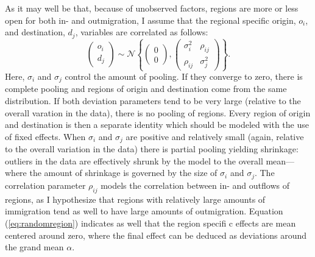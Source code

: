 \documentclass[11pt,parskip,abstracton,notitlepage, dvipsnames]{scrartcl}
\begin{document}
As it may well be that, because of unobserved factors, regions are more or less
open for both in- and outmigration, I assume that the regional specific origin,
$o_i$, and destination, $d_j$, variables are correlated as follows:
\begin{equation}
	\begin{pmatrix}o_i\\
		d_j
	\end{pmatrix} \sim \mathcal{N} \left\{\left(\begin{array}{c}
	0\\
	0
       \end{array}\right),
\left(                                        
\begin{array}{cc}
  \sigma^2_i & \rho_{ij} \\
  \rho_{ij} & \sigma^2_{j} 
\end{array}
\right)
\right\}.
\label{eq:randomregion}
\end{equation}
Here, $\sigma_i$ and $\sigma_j$ control the amount of pooling. If they converge
to zero, there is complete pooling and regions of origin and destination come
from the same distribution. If both deviation parameters tend to be very large
(relative to the overall varation in the data), there is no pooling of
regions. Every region of origin and destination is then a separate identity
which should be modeled with the use of fixed effects. When $\sigma_i$ and
$\sigma_j$ are positive and relatively small (again, relative to the overall
variation in the data) there is partial pooling yielding shrinkage: outliers in
the data are effectively shrunk by the model to the overall mean---where the
amount of shrinkage is governed by the size of $\sigma_i$ and $\sigma_j$. The
correlation parameter $\rho_{ij}$ models the correlation between in- and
outflows of regions, as I hypothesize that regions with relatively large amounts
of immigration tend as well to have large amounts of outmigration. Equation (\ref{eq:randomregion}) indicates as well that the region specifi c effects are mean centered around zero, where the final effect can be deduced as deviations around the grand mean $\alpha$.
\end{document}
